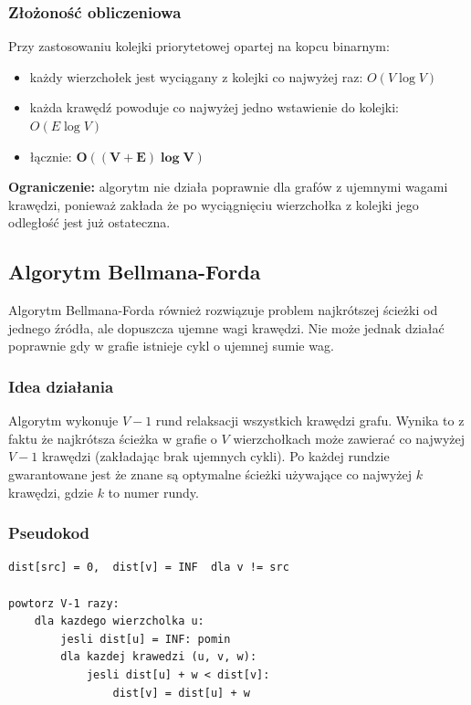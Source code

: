 \documentclass[12pt,a4paper]{article}
\begin{document}
\subsubsection*{Złożoność obliczeniowa}
 
Przy zastosowaniu kolejki priorytetowej opartej na kopcu binarnym:
\begin{itemize}
    \item każdy wierzchołek jest wyciągany z kolejki co najwyżej raz:
          $O(V \log V)$
    \item każda krawędź powoduje co najwyżej jedno wstawienie do kolejki:
          $O(E \log V)$
    \item łącznie: $\mathbf{O((V + E) \log V)}$
\end{itemize}
 
\textbf{Ograniczenie:} algorytm nie działa poprawnie dla grafów
z ujemnymi wagami krawędzi, ponieważ zakłada że po wyciągnięciu
wierzchołka z kolejki jego odległość jest już ostateczna.
 
\subsection{Algorytm Bellmana-Forda}
 
Algorytm Bellmana-Forda również rozwiązuje problem najkrótszej ścieżki
od jednego źródła, ale dopuszcza ujemne wagi krawędzi. Nie może jednak
działać poprawnie gdy w grafie istnieje cykl o ujemnej sumie wag.
 
\subsubsection*{Idea działania}
 
Algorytm wykonuje $V - 1$ rund relaksacji wszystkich krawędzi grafu.
Wynika to z faktu że najkrótsza ścieżka w grafie o $V$ wierzchołkach
może zawierać co najwyżej $V - 1$ krawędzi (zakładając brak ujemnych
cykli). Po każdej rundzie gwarantowane jest że znane są optymalne
ścieżki używające co najwyżej $k$ krawędzi, gdzie $k$ to numer rundy.
 
\subsubsection*{Pseudokod}
 
\begin{lstlisting}[style=cpp, caption={Pseudokod algorytmu Bellmana-Forda}]
dist[src] = 0,  dist[v] = INF  dla v != src
 
powtorz V-1 razy:
    dla kazdego wierzcholka u:
        jesli dist[u] = INF: pomin
        dla kazdej krawedzi (u, v, w):
            jesli dist[u] + w < dist[v]:
                dist[v] = dist[u] + w
\end{lstlisting}
 
\end{document}
